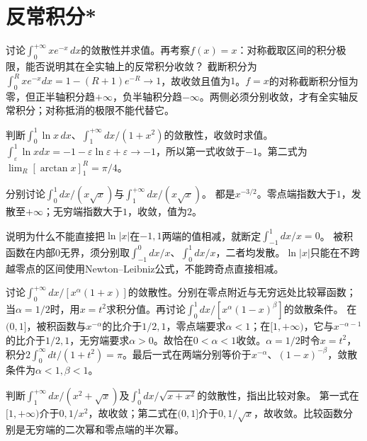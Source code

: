 \par\addvspace{12pt}

\section{反常积分*}

讨论\(\int_0^{+\infty}xe^{-x}\,dx\)的敛散性并求值。再考察\(f(x)=x\)：对称截取区间的积分极限，能否说明其在全实轴上的反常积分收敛？
\solutionanswer
截断积分为\(\int_0^Rxe^{-x}dx=1-(R+1)e^{-R}\to1\)，故收敛且值为\(1\)。\(f=x\)的对称截断积分恒为零，但正半轴积分趋\(+\infty\)，负半轴积分趋\(-\infty\)。两侧必须分别收敛，才有全实轴反常积分；对称抵消的极限不能代替它。


判断\(\int_0^1\ln x\,dx\)、\(\int_1^{+\infty}dx/(1+x^2)\)的敛散性，收敛时求值。
\solutionanswer
\(\int_\varepsilon^1\ln xdx=-1-\varepsilon\ln\varepsilon+\varepsilon\to-1\)，所以第一式收敛于\(-1\)。第二式为\(\lim_R[\arctan x]_1^R=\pi/4\)。


分别讨论\(\int_0^1dx/(x\sqrt{x})\)与\(\int_1^{+\infty}dx/(x\sqrt{x})\)。
\solutionanswer
都是\(x^{-3/2}\)。零点端指数大于\(1\)，发散至\(+\infty\)；无穷端指数大于\(1\)，收敛，值为\(2\)。


说明为什么不能直接把\(\ln|x|\)在\(-1,1\)两端的值相减，就断定\(\int_{-1}^1dx/x=0\)。
\solutionanswer
被积函数在内部\(0\)无界，须分别取\(\int_{-1}^0dx/x\)、\(\int_0^1dx/x\)，二者均发散。\(\ln|x|\)只能在不跨越零点的区间使用Newton--Leibniz公式，不能跨奇点直接相减。


讨论\(\int_0^{+\infty}dx/[x^\alpha(1+x)]\)的敛散性。分别在零点附近与无穷远处比较幂函数；当\(\alpha=1/2\)时，用\(x=t^2\)求积分值。再讨论\(\int_0^1dx/[x^\alpha(1-x)^\beta]\)的敛散条件。
\solutionanswer
在\((0,1]\)，被积函数与\(x^{-\alpha}\)的比介于\(1/2,1\)，零点端要求\(\alpha<1\)；在\([1,+\infty)\)，它与\(x^{-\alpha-1}\)的比介于\(1/2,1\)，无穷端要求\(\alpha>0\)。故恰在\(0<\alpha<1\)收敛。\(\alpha=1/2\)时令\(x=t^2\)，积分\(2\int_0^\infty dt/(1+t^2)=\pi\)。最后一式在两端分别等价于\(x^{-\alpha}\)、\((1-x)^{-\beta}\)，敛散条件为\(\alpha<1,\beta<1\)。


判断\(\int_1^{+\infty}dx/(x^2+\sqrt{x})\)及\(\int_0^1dx/\sqrt{x+x^2}\)的敛散性，指出比较对象。
\solutionanswer
第一式在\([1,+\infty)\)介于\(0,1/x^2\)，故收敛；第二式在\((0,1]\)介于\(0,1/\sqrt x\)，故收敛。比较函数分别是无穷端的二次幂和零点端的半次幂。


